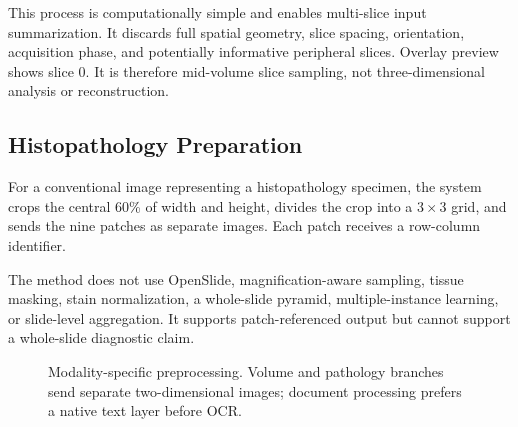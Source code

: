 \documentclass[conference]{IEEEtran}
\begin{document}
This process is computationally simple and enables multi-slice input summarization. It discards full spatial geometry, slice spacing, orientation, acquisition phase, and potentially informative peripheral slices. Overlay preview shows slice 0. It is therefore mid-volume slice sampling, not three-dimensional analysis or reconstruction.

\subsection{Histopathology Preparation}

For a conventional image representing a histopathology specimen, the system crops the central 60\% of width and height, divides the crop into a \(3\times3\) grid, and sends the nine patches as separate images. Each patch receives a row-column identifier.

The method does not use OpenSlide, magnification-aware sampling, tissue masking, stain normalization, a whole-slide pyramid, multiple-instance learning, or slide-level aggregation. It supports patch-referenced output but cannot support a whole-slide diagnostic claim.

\begin{figure}[t]
\centering
{}
\caption{Modality-specific preprocessing. Volume and pathology branches send separate two-dimensional images; document processing prefers a native text layer before OCR.}
\label{fig:preprocessing}
\end{figure}
\end{document}
